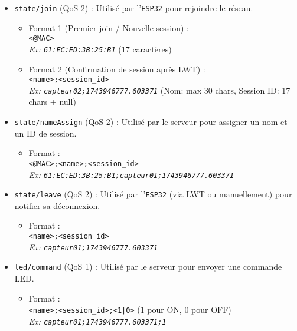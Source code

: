 \documentclass[12pt]{article}
\begin{document}
\begin{itemize}
    \item \texttt{state/join} (QoS 2) : Utilisé par l'\texttt{ESP32} pour rejoindre le réseau.
    \begin{itemize}
        \item Format 1 (Premier join / Nouvelle session) : \\
        \texttt{<@MAC>} \\
        \textit{Ex: \texttt{61:EC:ED:3B:25:B1}} (17 caractères)
        \item Format 2 (Confirmation de session après LWT) : \\
        \texttt{<name>;<session\_id>} \\
        \textit{Ex: \texttt{capteur02;1743946777.603371}} (Nom: max 30 chars, Session ID: 17 chars + null)
    \end{itemize}

    \item \texttt{state/nameAssign} (QoS 2) : Utilisé par le serveur pour assigner un nom et un ID de session.
    \begin{itemize}
        \item Format : \\
        \texttt{<@MAC>;<name>;<session\_id>} \\
        \textit{Ex: \texttt{61:EC:ED:3B:25:B1;capteur01;1743946777.603371}}
    \end{itemize}

    \item \texttt{state/leave} (QoS 2) : Utilisé par l'\texttt{ESP32} (via LWT ou manuellement) pour notifier sa déconnexion.
    \begin{itemize}
        \item Format : \\
        \texttt{<name>;<session\_id>} \\
        \textit{Ex: \texttt{capteur01;1743946777.603371}}
    \end{itemize}

    \item \texttt{led/command} (QoS 1) : Utilisé par le serveur pour envoyer une commande LED.
    \begin{itemize}
        \item Format : \\
        \texttt{<name>;<session\_id>;<1|0>} (1 pour ON, 0 pour OFF) \\
        \textit{Ex: \texttt{capteur01;1743946777.603371;1}}
    \end{itemize}


\end{itemize}
\end{document}
